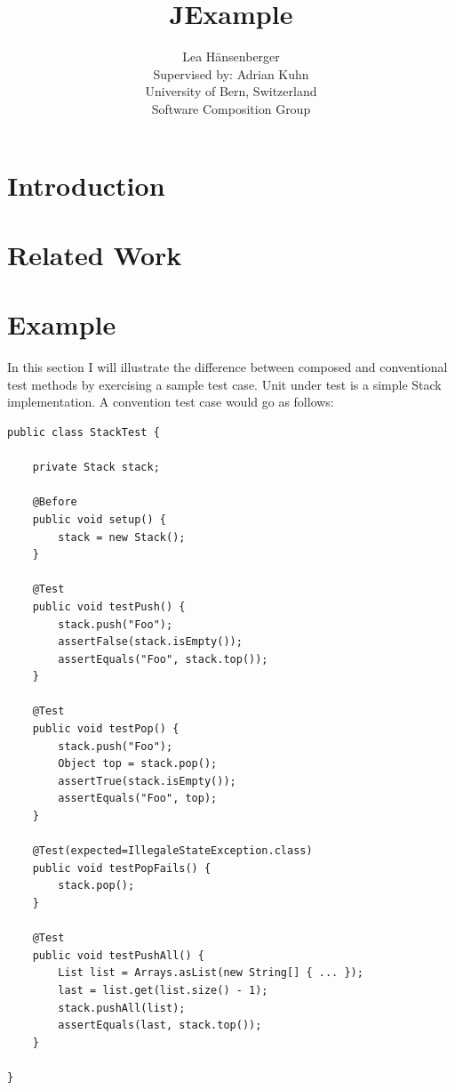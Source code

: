 \documentclass[11pt]{article}
\newcommand{\JUnit}{\textsc{JUnit}\xspace}
\begin{document}
\title{JExample}

\author{Lea H\"ansenberger\\
	Supervised by: Adrian Kuhn\\
	University of Bern, Switzerland\\
	Software Composition Group
}

\maketitle

\begin{abstract}

\end{abstract}

\section{Introduction}
 
\section{Related Work}

\section{Example}

In this section I will illustrate the difference between composed and conventional test methods by exercising a sample test case. Unit under test is a simple Stack implementation. A convention test case would go as follows:

\begin{lstlisting}[label=lst:junit,caption=Conventional \JUnit test case.]
public class StackTest {

    private Stack stack;

    @Before
    public void setup() {
        stack = new Stack();
    }

    @Test
    public void testPush() {
        stack.push("Foo");
        assertFalse(stack.isEmpty());
        assertEquals("Foo", stack.top());
    }

    @Test
    public void testPop() {
        stack.push("Foo");
        Object top = stack.pop();
        assertTrue(stack.isEmpty());
        assertEquals("Foo", top);
    }

    @Test(expected=IllegaleStateException.class)
    public void testPopFails() {
        stack.pop();
    }

    @Test
    public void testPushAll() {
        List list = Arrays.asList(new String[] { ... });
        last = list.get(list.size() - 1);
        stack.pushAll(list);
        assertEquals(last, stack.top());
    }

}
\end{lstlisting}
\end{document}
